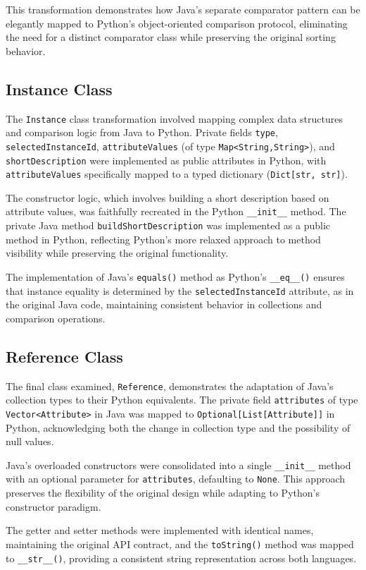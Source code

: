 \documentclass[12pt,a4paper]{article}
\begin{document}
This transformation demonstrates how Java's separate comparator pattern can be elegantly mapped to Python's object-oriented comparison protocol, eliminating the need for a distinct comparator class while preserving the original sorting behavior.

\subsection{Instance Class}
The \texttt{Instance} class transformation involved mapping complex data structures and comparison logic from Java to Python. Private fields \texttt{type}, \texttt{selectedInstanceId}, \texttt{attributeValues} (of type \texttt{Map<String,String>}), and \texttt{shortDescription} were implemented as public attributes in Python, with \texttt{attributeValues} specifically mapped to a typed dictionary (\texttt{Dict[str, str]}).

The constructor logic, which involves building a short description based on attribute values, was faithfully recreated in the Python \texttt{\_\_init\_\_} method. The private Java method \texttt{buildShortDescription} was implemented as a public method in Python, reflecting Python's more relaxed approach to method visibility while preserving the original functionality.

The implementation of Java's \texttt{equals()} method as Python's \texttt{\_\_eq\_\_()} ensures that instance equality is determined by the \texttt{selectedInstanceId} attribute, as in the original Java code, maintaining consistent behavior in collections and comparison operations.

\subsection{Reference Class}
The final class examined, \texttt{Reference}, demonstrates the adaptation of Java's collection types to their Python equivalents. The private field \texttt{attributes} of type \texttt{Vector<Attribute>} in Java was mapped to \texttt{Optional[List[Attribute]]} in Python, acknowledging both the change in collection type and the possibility of null values.

Java's overloaded constructors were consolidated into a single \texttt{\_\_init\_\_} method with an optional parameter for \texttt{attributes}, defaulting to \texttt{None}. This approach preserves the flexibility of the original design while adapting to Python's constructor paradigm.

The getter and setter methods were implemented with identical names, maintaining the original API contract, and the \texttt{toString()} method was mapped to \texttt{\_\_str\_\_()}, providing a consistent string representation across both languages.
\end{document}
